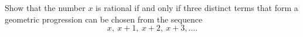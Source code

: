 Show that the number $x$ is rational if and only if three distinct terms that form a geometric progression can be chosen from the sequence\[x, ~ x+1, ~ x+2,~ x+3,\ldots . \]